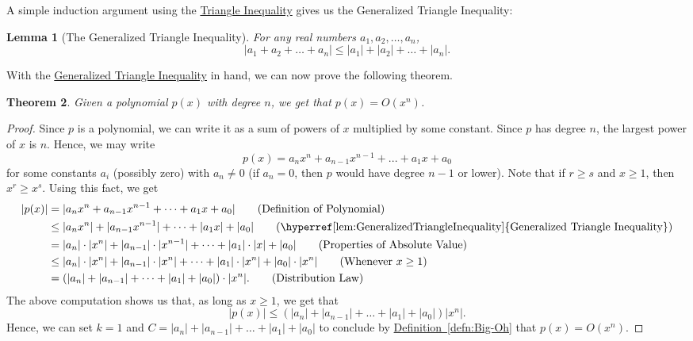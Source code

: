 \documentclass[11pt,oneside]{book}
\newtheorem{thm}{Theorem}[section]
\newtheorem{lem}[thm]{Lemma}
\theoremstyle{definition}
\begin{document}
A simple induction argument using the \hyperref[lem:TriangleInequality]{Triangle Inequality} gives us the Generalized Triangle Inequality:

\begin{lem}[The Generalized Triangle Inequality] \label{lem:GeneralizedTriangleInequality}
    For any real numbers $a_{1}, a_{2}, \dots, a_{n}$,
    \[ |a_{1} + a_{2} + \dots + a_{n}| \leq |a_{1}| + |a_{2}| + \dots + |a_{n}|. \]
\end{lem}

With the \hyperref[lem:GeneralizedTriangleInequality]{Generalized Triangle Inequality} in hand, we can now prove the following theorem.

\begin{thm} \label{thm:LeadingTermDominates}
    Given a polynomial $p(x)$ with degree $n$, we get that $p(x) = O(x^{n})$.
\end{thm}
\begin{proof}
    Since $p$ is a polynomial, we can write it as a sum of powers of $x$ multiplied by some constant.
    Since $p$ has degree $n$, the largest power of $x$ is $n$.
    Hence, we may write
    \[ p(x) = a_{n}x^{n} + a_{n - 1}x^{n - 1} + ... + a_{1}x + a_{0} \]
    for some constants $a_{i}$ (possibly zero) with $a_{n} \neq 0$ (if $a_{n} = 0$, then $p$ would have degree $n - 1$ or lower).
    Note that if $r \geq s$ and $x \geq 1$, then $x^{r} \geq x^{s}$.
    Using this fact, we get
    \begin{align}
        |p(x)|
        &= |a_{n}x^{n} + a_{n - 1}x^{n - 1} + \dots + a_{1}x + a_{0}| \tag{Definition of Polynomial} \\
        &\leq |a_{n}x^{n}| + |a_{n - 1}x^{n - 1}| + \dots + |a_{1}x| + |a_{0}| \tag{\hyperref[lem:GeneralizedTriangleInequality]{Generalized Triangle Inequality}} \\
        &= |a_{n}| \cdot |x^{n}| + |a_{n - 1}| \cdot |x^{n - 1}| + \dots + |a_{1}| \cdot |x| + |a_{0}| \tag{Properties of Absolute Value} \\
        &\leq |a_{n}| \cdot |x^{n}| + |a_{n - 1}| \cdot |x^{n}| + \dots + |a_{1}| \cdot |x^{n}| + |a_{0}| \cdot |x^{n}| \tag{Whenever $x \geq 1$} \\
        &= (|a_{n}| + |a_{n - 1}| + \dots + |a_{1}| + |a_{0}|) \cdot |x^{n}|.\tag{Distribution Law}
    \end{align}
    The above computation shows us that, as long as $x \geq 1$, we get that
    \[ |p(x)| \leq (|a_{n}| + |a_{n - 1}| + \dots + |a_{1}| + |a_{0}|)|x^{n}|. \]
    Hence, we can set $k = 1$ and $C = |a_{n}| + |a_{n - 1}| + \dots + |a_{1}| + |a_{0}|$ to conclude by \hyperref[defn:Big-Oh]{Definition~\ref*{defn:Big-Oh}} that $p(x) = O(x^{n})$.
\end{proof}
\end{document}
